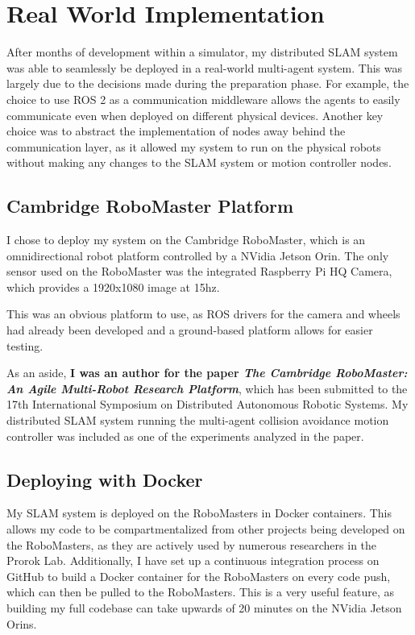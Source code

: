 \section{Real World Implementation}
\label{sec:real-world-implementation}
After months of development within a simulator, my distributed SLAM system was able to seamlessly be deployed in a real-world multi-agent system. This was largely due to the decisions made during the preparation phase. For example, the choice to use ROS 2 as a communication middleware allows the agents to easily communicate even when deployed on different physical devices. Another key choice was to abstract the implementation of nodes away behind the communication layer, as it allowed my system to run on the physical robots without making any changes to the SLAM system or motion controller nodes.

\subsection{Cambridge RoboMaster Platform}
\label{sec:cambridge-robomaster-platform}
I chose to deploy my system on the Cambridge RoboMaster, which is an omnidirectional robot platform controlled by a NVidia Jetson Orin. The only sensor used on the RoboMaster was the integrated Raspberry Pi HQ Camera, which provides a 1920x1080 image at 15hz.

This was an obvious platform to use, as ROS drivers for the camera and wheels had already been developed and a ground-based platform allows for easier testing.

As an aside, \textbf{I was an author for the paper \textit{The Cambridge RoboMaster: An Agile Multi-Robot Research Platform}}, which has been submitted to the 17th International Symposium on Distributed Autonomous Robotic Systems. My distributed SLAM system running the multi-agent collision avoidance motion controller was included as one of the experiments analyzed in the paper.

\subsection{Deploying with Docker}
\label{sec:deploying-with-docker}
My SLAM system is deployed on the RoboMasters in Docker containers. This allows my code to be compartmentalized from other projects being developed on the RoboMasters, as they are actively used by numerous researchers in the Prorok Lab. Additionally, I have set up a continuous integration process on GitHub to build a Docker container for the RoboMasters on every code push, which can then be pulled to the RoboMasters. This is a very useful feature, as building my full codebase can take upwards of 20 minutes on the NVidia Jetson Orins.

